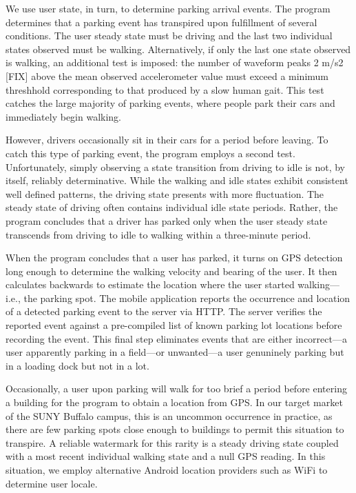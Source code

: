 We use user state, in turn, to determine parking arrival events. The program
determines that a parking event has transpired upon fulfillment of several
conditions.  The user steady state must be driving and the last two
individual states observed must be walking.  Alternatively, if only the last
one state observed is walking, an additional test is imposed:  the number of
waveform peaks 2 m/s2 [FIX] above the mean observed accelerometer value must
exceed a minimum threshhold corresponding to that produced by a slow human
gait.  This test catches the large majority of parking events, where people
park their cars and immediately begin walking.

However, drivers occasionally sit in their cars for a period before leaving.
To catch this type of parking event, the program employs a second test.
Unfortunately, simply observing a state transition from driving to idle is
not, by itself, reliably determinative.  While the walking and idle states
exhibit consistent well defined patterns, the driving state presents with
more fluctuation.  The steady state of driving often contains individual
idle state periods.  Rather, the program concludes that a driver has parked
only when the user steady state transcends from driving to idle to walking
within a three-minute period.

When the program concludes that a user has parked, it turns on GPS detection
long enough to determine the walking velocity and bearing of the user.  It
then calculates backwards to estimate the location where the user started
walking---i.e., the parking spot.  The mobile application reports the
occurrence and location of a detected parking event to the server via HTTP.
The server verifies the reported event against a pre-compiled list of known
parking lot locations before recording the event.  This final step eliminates
events that are either incorrect---a user apparently parking in a field---or
unwanted---a user genuninely parking but in a loading dock but not in a lot.

Occasionally, a user upon parking will walk for too brief a period before
entering a building for the program to obtain a location from GPS.  In our
target market of the SUNY Buffalo campus, this is an uncommon occurrence in
practice, as there are few parking spots close enough to buildings to permit
this situation to transpire.  A reliable watermark for this rarity is a
steady driving state coupled with a most recent individual walking state and
a null GPS reading.  In this situation, we employ alternative Android
location providers such as WiFi to determine user locale.

